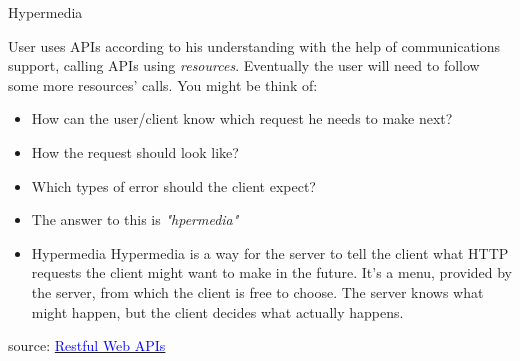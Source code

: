 \documentclass{beamer}
\begin{document}
\begin{frame}[t]{Hypermedia}
		
		User uses APIs according to his understanding with the help of communications support, calling APIs using \textit{resources}. Eventually the user will need to follow some more resources' calls. You might be think of:
		
		\scriptsize		
		\begin{itemize}
			\item<1-> How can the user/client know which request he needs to make next?
			\item<2-> How the request should look like?
			\item<3-> Which types of error should the client expect?
			
			\item<4->[] \normalsize The answer to this is \textit{"hpermedia"}
			
			\item<5->[] 
				\small
				\begin{block}{Hypermedia}
					Hypermedia is a way for the server to tell the client what HTTP requests the client might want to make in the future. It’s a menu, provided by the server, from which the client is free to choose. The server knows what might happen, but the client decides what actually happens.
				\end{block}
		\end{itemize}		

\tiny source: \href{https://www.oreilly.com/library/view/restful-web-apis/9781449359713/} {\textcolor{blue}{Restful Web APIs}} 	
\end{frame}
\end{document}
